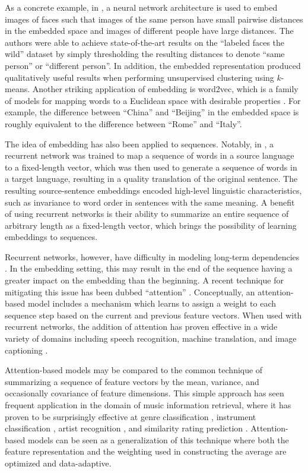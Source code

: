 \documentclass{article}
\begin{document}
As a concrete example, in \cite{schroff2015facenet}, a neural network architecture is used to embed images of faces such that images of the same person have small pairwise distances in the embedded space and images of different people have large distances.
The authors were able to achieve state-of-the-art results on the ``labeled faces the wild'' dataset by simply thresholding the resulting distances to denote ``same person'' or ``different person''.
In addition, the embedded representation produced qualitatively useful results when performing unsupervised clustering using $k$-means.
Another striking application of embedding is word2vec, which is a family of models for mapping words to a Euclidean space with desirable properties \cite{mikolov2013distributed}.
For example, the difference between ``China'' and ``Beijing'' in the embedded space is roughly equivalent to the difference between ``Rome'' and ``Italy''.

The idea of embedding has also been applied to sequences.
Notably, in \cite{sutskever2014sequence}, a recurrent network was trained to map a sequence of words in a source language to a fixed-length vector, which was then used to generate a sequence of words in a target language, resulting in a quality translation of the original sentence.
The resulting source-sentence embeddings encoded high-level linguistic characteristics, such as invariance to word order in sentences with the same meaning.
A benefit of using recurrent networks is their ability to summarize an entire sequence of arbitrary length as a fixed-length vector, which brings the possibility of learning embeddings to sequences.

Recurrent networks, however, have difficulty in modeling long-term dependencies \cite{bengio1994learning}.
In the embedding setting, this may result in the end of the sequence having a greater impact on the embedding than the beginning.
A recent technique for mitigating this issue has been dubbed ``attention'' \cite{bahdanau2014neural}.
Conceptually, an attention-based model includes a mechanism which learns to assign a weight to each sequence step based on the current and previous feature vectors.
When used with recurrent networks, the addition of attention has proven effective in a wide variety of domains including speech recognition, machine translation, and image captioning \cite{cho2015describing}.

Attention-based models may be compared to the common technique of summarizing a sequence of feature vectors by the mean, variance, and occasionally covariance of feature dimensions.
This simple approach has seen frequent application in the domain of music information retrieval, where it has proven to be surprisingly effective at genre classification \cite{tzanetakis2002musical}, instrument classification \cite{deng2008study}, artist recognition \cite{mandel2005song}, and similarity rating prediction \cite{foster2014sequential}.
Attention-based models can be seen as a generalization of this technique where both the feature representation and the weighting used in constructing the average are optimized and data-adaptive.
\end{document}
